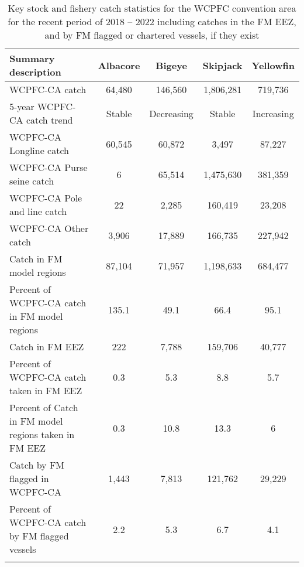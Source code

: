 \begin{longtable}{lcccc}
\caption{Key stock and fishery catch statistics for the WCPFC convention area for the recent period of 2018 -- 2022 including catches in the FM EEZ, and by FM flagged or chartered vessels, if they exist} \\ 
  \hline
Summary description & Albacore & Bigeye & Skipjack & Yellowfin \\ 
  \hline
WCPFC-CA catch & 64,480 & 146,560 & 1,806,281 & 719,736 \\ 
  5-year WCPFC-CA catch trend & Stable & Decreasing & Stable & Increasing \\ 
  WCPFC-CA Longline catch & 60,545 & 60,872 & 3,497 & 87,227 \\ 
  WCPFC-CA Purse seine catch & 6 & 65,514 & 1,475,630 & 381,359 \\ 
  WCPFC-CA Pole and line catch & 22 & 2,285 & 160,419 & 23,208 \\ 
  WCPFC-CA Other catch & 3,906 & 17,889 & 166,735 & 227,942 \\ 
  Catch in FM model regions & 87,104 & 71,957 & 1,198,633 & 684,477 \\ 
  Percent of WCPFC-CA catch in FM model regions & 135.1 & 49.1 & 66.4 & 95.1 \\ 
   \hline
Catch in FM EEZ & 222 & 7,788 & 159,706 & 40,777 \\ 
  Percent of WCPFC-CA catch taken in FM EEZ & 0.3 & 5.3 & 8.8 & 5.7 \\ 
  Percent of Catch in FM model regions taken in FM EEZ & 0.3 & 10.8 & 13.3 & 6 \\ 
  Catch by FM flagged in WCPFC-CA & 1,443 & 7,813 & 121,762 & 29,229 \\ 
  Percent of WCPFC-CA catch by FM flagged vessels & 2.2 & 5.3 & 6.7 & 4.1 \\ 
  \hline
\label{cat_sum_tab}
\end{longtable}
